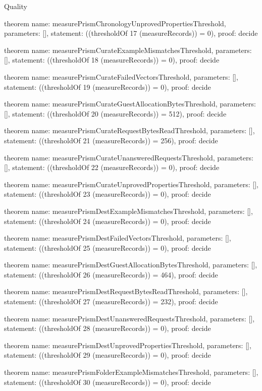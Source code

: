 \begin{lexlean}{Quality}
\begin{semanticmodule}
theorem{
  name: measurePrismChronologyUnprovedPropertiesThreshold,
  parameters: [],
  statement: ((thresholdOf 17 (measureRecords)) = 0),
  proof: decide{}
}

theorem{
  name: measurePrismCurateExampleMismatchesThreshold,
  parameters: [],
  statement: ((thresholdOf 18 (measureRecords)) = 0),
  proof: decide{}
}

theorem{
  name: measurePrismCurateFailedVectorsThreshold,
  parameters: [],
  statement: ((thresholdOf 19 (measureRecords)) = 0),
  proof: decide{}
}

theorem{
  name: measurePrismCurateGuestAllocationBytesThreshold,
  parameters: [],
  statement: ((thresholdOf 20 (measureRecords)) = 512),
  proof: decide{}
}

theorem{
  name: measurePrismCurateRequestBytesReadThreshold,
  parameters: [],
  statement: ((thresholdOf 21 (measureRecords)) = 256),
  proof: decide{}
}

theorem{
  name: measurePrismCurateUnansweredRequestsThreshold,
  parameters: [],
  statement: ((thresholdOf 22 (measureRecords)) = 0),
  proof: decide{}
}

theorem{
  name: measurePrismCurateUnprovedPropertiesThreshold,
  parameters: [],
  statement: ((thresholdOf 23 (measureRecords)) = 0),
  proof: decide{}
}

theorem{
  name: measurePrismDestExampleMismatchesThreshold,
  parameters: [],
  statement: ((thresholdOf 24 (measureRecords)) = 0),
  proof: decide{}
}

theorem{
  name: measurePrismDestFailedVectorsThreshold,
  parameters: [],
  statement: ((thresholdOf 25 (measureRecords)) = 0),
  proof: decide{}
}

theorem{
  name: measurePrismDestGuestAllocationBytesThreshold,
  parameters: [],
  statement: ((thresholdOf 26 (measureRecords)) = 464),
  proof: decide{}
}

theorem{
  name: measurePrismDestRequestBytesReadThreshold,
  parameters: [],
  statement: ((thresholdOf 27 (measureRecords)) = 232),
  proof: decide{}
}

theorem{
  name: measurePrismDestUnansweredRequestsThreshold,
  parameters: [],
  statement: ((thresholdOf 28 (measureRecords)) = 0),
  proof: decide{}
}

theorem{
  name: measurePrismDestUnprovedPropertiesThreshold,
  parameters: [],
  statement: ((thresholdOf 29 (measureRecords)) = 0),
  proof: decide{}
}

theorem{
  name: measurePrismFolderExampleMismatchesThreshold,
  parameters: [],
  statement: ((thresholdOf 30 (measureRecords)) = 0),
  proof: decide{}
}


\end{semanticmodule}
\end{lexlean}
